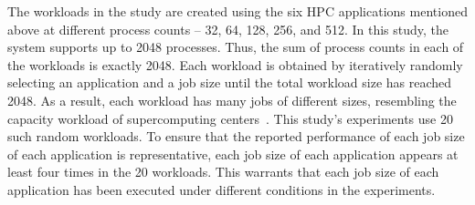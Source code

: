 The workloads in the study are created using the six HPC applications mentioned
above at different process counts -- 32, 64, 128, 256, and 512.  In this study,
the system supports up to 2048 processes. Thus, the sum of process counts in
each of the workloads is exactly 2048.  Each workload is obtained by
iteratively randomly selecting an application and a job size until the total
workload size has reached 2048.  As a result, each workload has many jobs of
different sizes, resembling the capacity workload of supercomputing
centers~\cite{jain2016evaluating}.  This study's experiments use 20 such random
workloads. To ensure that the reported performance of each job size of each
application is representative, each job size of each application
appears at least four times in the 20 workloads. This warrants that each job
size of each application has been executed under different conditions in the
experiments.
 
